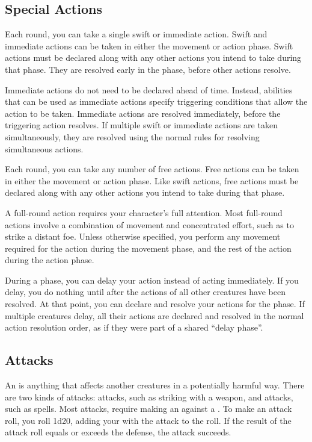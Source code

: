     \subsection{Special Actions}

        \label{Swift and Immediate Actions} Each round, you can take a single swift or immediate action.
        Swift and immediate actions can be taken in either the movement or action phase.
        Swift actions must be declared along with any other actions you intend to take during that phase.
        They are resolved early in the phase, before other actions resolve.

        Immediate actions do not need to be declared ahead of time.
        Instead, abilities that can be used as immediate actions specify triggering conditions that allow the action to be taken.
        Immediate actions are resolved immediately, before the triggering action resolves.
        If multiple swift or immediate actions are taken simultaneously, they are resolved using the normal rules for resolving simultaneous actions.

        \label{Free Actions} Each round, you can take any number of free actions.
        Free actions can be taken in either the movement or action phase.
        Like swift actions, free actions must be declared along with any other actions you intend to take during that phase.

         A full-round action requires your character's full attention.
        Most full-round actions involve a combination of movement and concentrated effort, such as  to strike a distant foe.
        Unless otherwise specified, you perform any movement required for the action during the movement phase, and the rest of the action during the action phase.

        \label{Delaying}
        During a phase, you can delay your action instead of acting immediately.
        If you delay, you do nothing until after the actions of all other creatures have been resolved.
        At that point, you can declare and resolve your actions for the phase.
        If multiple creatures delay, all their actions are declared and resolved in the normal action resolution order, as if they were part of a shared ``delay phase''.

    \subsection{Attacks}\label{Attacks}
        An  is anything that affects another creatures in a potentially harmful way.
        There are two kinds of attacks:  attacks, such as striking with a weapon, and  attacks, such as spells.
        Most attacks, require making an  against a .
        To make an attack roll, you roll 1d20, adding your  with the attack to the roll.
        If the result of the attack roll equals or exceeds the defense, the attack succeeds.

